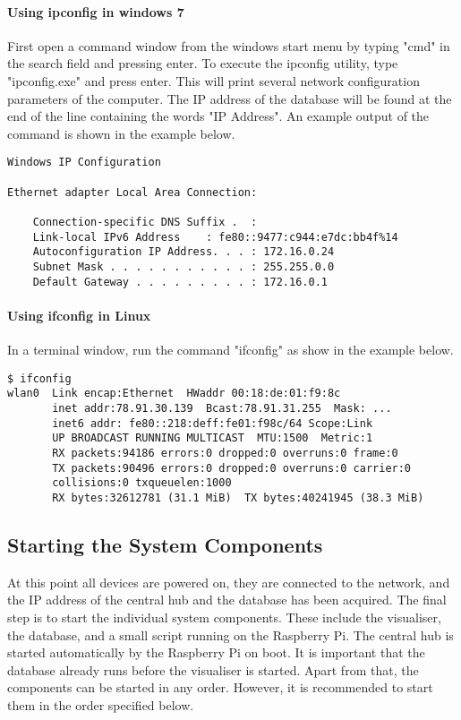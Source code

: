 \documentclass[../document.tex]{subfiles}
\begin{document}
\paragraph{Using ipconfig in windows 7}
First open a command window from the windows start menu by typing "cmd" in the search field and pressing enter. To execute the ipconfig utility, type "ipconfig.exe" and press enter. This will print several network configuration parameters of the computer. The IP address of the database will be found at the end of the line containing the words "IP Address". An example output of the command is shown in the example below.

\lstset{style=custombash}
\begin{lstlisting}[caption=Example output of the ipconfig command in Windows]
Windows IP Configuration

Ethernet adapter Local Area Connection:

    Connection-specific DNS Suffix .  :
    Link-local IPv6 Address	   : fe80::9477:c944:e7dc:bb4f%14
    Autoconfiguration IP Address. . . : 172.16.0.24
    Subnet Mask . . . . . . . . . . . : 255.255.0.0
    Default Gateway . . . . . . . . . : 172.16.0.1
\end{lstlisting}


\paragraph{Using ifconfig in Linux}
In a terminal window, run the command "ifconfig" as show in the example below.

\lstset{style=custombash}
\begin{lstlisting}[caption=Example output of the ifconfig command in Linux]
$ ifconfig
wlan0  Link encap:Ethernet  HWaddr 00:18:de:01:f9:8c  
       inet addr:78.91.30.139  Bcast:78.91.31.255  Mask: ...
       inet6 addr: fe80::218:deff:fe01:f98c/64 Scope:Link
       UP BROADCAST RUNNING MULTICAST  MTU:1500  Metric:1
       RX packets:94186 errors:0 dropped:0 overruns:0 frame:0
       TX packets:90496 errors:0 dropped:0 overruns:0 carrier:0
       collisions:0 txqueuelen:1000 
       RX bytes:32612781 (31.1 MiB)  TX bytes:40241945 (38.3 MiB)
\end{lstlisting}


\subsection{Starting the System Components}
At this point all devices are powered on, they are connected to the network, and the IP address of the central hub and the database has been acquired. The final step is to start the individual system components. These include the visualiser, the database, and a small script running on the \gls{Raspberry Pi}. The central hub is started automatically by the \gls{Raspberry Pi} on boot. It is important that the database already runs before the visualiser is started. Apart from that, the components can be started in any order. However, it is recommended to start them in the order specified below.
\end{document}
